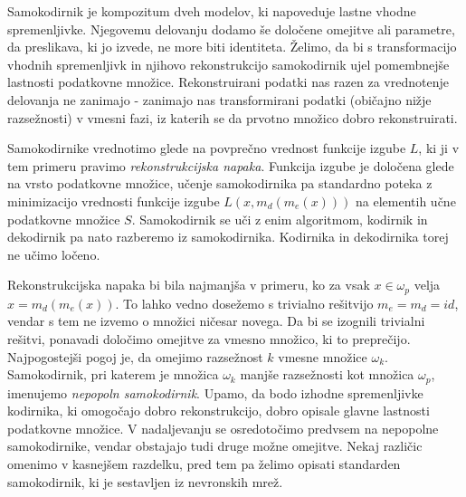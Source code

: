 \documentclass[12pt,a4paper,twoside]{article}
\theoremstyle{definition} %
\theoremstyle{plain} %
\numberwithin{equation}{section}  %
\begin{document}
Samokodirnik je kompozitum dveh modelov, ki napoveduje lastne vhodne spremenljivke. 
Njegovemu delovanju dodamo še določene omejitve ali parametre, da preslikava, ki jo izvede, ne more biti identiteta. 
Želimo, da bi s transformacijo vhodnih spremenljivk in njihovo rekonstrukcijo samokodirnik ujel pomembnejše lastnosti podatkovne množice. 
Rekonstruirani podatki nas razen za vrednotenje delovanja ne zanimajo - zanimajo nas transformirani podatki (običajno nižje razsežnosti) v vmesni fazi, iz katerih se da prvotno množico dobro rekonstruirati.

Samokodirnike vrednotimo glede na povprečno vrednost funkcije izgube $L$, ki ji v tem primeru pravimo \emph{rekonstrukcijska napaka}. 
Funkcija izgube je določena glede na vrsto podatkovne množice, učenje samokodirnika pa standardno poteka z minimizacijo vrednosti funkcije izgube $L(x,m_d(m_e(x)))$ na elementih učne podatkovne množice $S$. 
Samokodirnik se uči z enim algoritmom, kodirnik in dekodirnik pa nato razberemo iz samokodirnika. Kodirnika in dekodirnika torej ne učimo ločeno.

Rekonstrukcijska napaka bi bila najmanjša v primeru, ko za vsak $x \in \omega_p$ velja $x = m_d(m_e(x))$. 
To lahko vedno dosežemo s trivialno rešitvijo $m_e = m_d = id$, vendar s tem ne izvemo o množici ničesar novega.
Da bi se izognili trivialni rešitvi, ponavadi določimo omejitve za vmesno množico, ki to preprečijo.
Najpogostejši pogoj je, da omejimo razsežnost $k$ vmesne množice $\omega_k$. 
Samokodirnik, pri katerem je množica $\omega_k$ manjše razsežnosti kot množica $\omega_p$, imenujemo \emph{nepopoln samokodirnik}. 
Upamo, da bodo izhodne spremenljivke kodirnika, ki omogočajo dobro rekonstrukcijo, dobro opisale glavne lastnosti podatkovne množice. %
V nadaljevanju se osredotočimo predvsem na nepopolne samokodirnike, vendar obstajajo tudi druge možne omejitve. 
Nekaj različic omenimo v kasnejšem razdelku, pred tem pa želimo opisati standarden samokodirnik, ki je sestavljen iz nevronskih mrež. 
\end{document}
